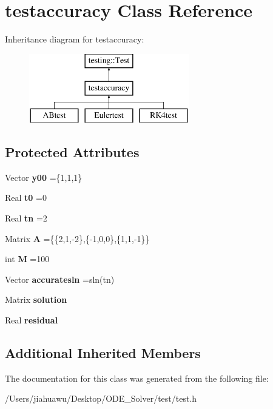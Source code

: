\hypertarget{classtestaccuracy}{}\section{testaccuracy Class Reference}
\label{classtestaccuracy}
Inheritance diagram for testaccuracy\+:\begin{figure}[H]
\begin{center}
\leavevmode
\includegraphics[height=3.000000cm]{classtestaccuracy}
\end{center}
\end{figure}
\subsection*{Protected Attributes}
\begin{DoxyCompactItemize}
\item 
\mbox{\label{classtestaccuracy_a43673208dc9dc2c80a4f031232264925}} 
Vector {\bfseries y00} =\{1,1,1\}
\item 
\mbox{\label{classtestaccuracy_abcb540c18b0a9aaee3c6466ad6c76944}} 
Real {\bfseries t0} =0
\item 
\mbox{\label{classtestaccuracy_a5ce4227d4441bf0818cae2dde2e17552}} 
Real {\bfseries tn} =2
\item 
\mbox{\label{classtestaccuracy_a99ddf362fdf4bdd52e41f6de3a432363}} 
Matrix {\bfseries A} =\{\{2,1,-\/2\},\{-\/1,0,0\},\{1,1,-\/1\}\}
\item 
\mbox{\label{classtestaccuracy_a1716a10a99817a52885edccad5246cb3}} 
int {\bfseries M} =100
\item 
\mbox{\label{classtestaccuracy_aae4fa8bc83ff4315550cf05f826f106c}} 
Vector {\bfseries accuratesln} =sln(tn)
\item 
\mbox{\label{classtestaccuracy_a3c127b1551f71b33fd6fc692936cf8e0}} 
Matrix {\bfseries solution}
\item 
\mbox{\label{classtestaccuracy_a125396de84f2dbfaa06d2547debacbc4}} 
Real {\bfseries residual}
\end{DoxyCompactItemize}
\subsection*{Additional Inherited Members}


The documentation for this class was generated from the following file\+:\begin{DoxyCompactItemize}
\item 
/\+Users/jiahuawu/\+Desktop/\+O\+D\+E\+\_\+\+Solver/test/test.\+h\end{DoxyCompactItemize}
